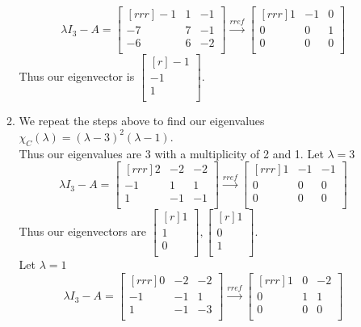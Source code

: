 \documentclass[12pt]{article}
\theoremstyle{definition}
\theoremstyle{plain}
\begin{document}
\begin{enumerate}
\begin{enumerate}
	\[ \lambda I_3-A=\begin{bmatrix}[rrr]-1&1&-1\\-7&7&-1\\-6&6&-2\\\end{bmatrix} \xrightarrow[]{rref} \begin{bmatrix}[rrr]1&-1&0\\0&0&1\\0&0&0\\\end{bmatrix} \]
	Thus our eigenvector is $\begin{bmatrix}[r]-1\\-1\\1\\\end{bmatrix}$.
	\item We repeat the steps above to find our eigenvalues $\chi_C(\lambda)=(\lambda-3)^2(\lambda-1)$.\\
	Thus our eigenvalues are 3 with a multiplicity of 2 and 1.
	Let $\lambda=3$
	\[ \lambda I_3-A=\begin{bmatrix}[rrr]2&-2&-2\\-1&1&1\\1&-1&-1\\\end{bmatrix} \xrightarrow[]{rref} \begin{bmatrix}[rrr]1&-1&-1\\0&0&0\\0&0&0\\\end{bmatrix} \]
	Thus our eigenvectors are $\begin{bmatrix}[r]1\\1\\0\\\end{bmatrix},\begin{bmatrix}[r]1\\0\\1\\\end{bmatrix}$.\\
	Let $\lambda=1$
	\[ \lambda I_3-A=\begin{bmatrix}[rrr]0&-2&-2\\-1&-1&1\\1&-1&-3\\\end{bmatrix}\xrightarrow[]{rref}\begin{bmatrix}[rrr]1&0&-2\\0&1&1\\0&0&0\\\end{bmatrix} \]

\end{enumerate}
\end{enumerate}
\end{document}
